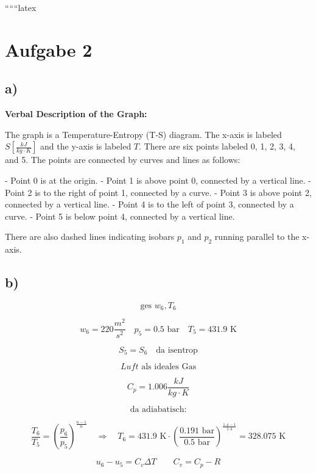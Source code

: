 
``````latex


\section*{Aufgabe 2}

\subsection*{a)}

\begin{center}
\textbf{Verbal Description of the Graph:}

The graph is a Temperature-Entropy (T-S) diagram. The x-axis is labeled \( S \left[ \frac{kJ}{kg \cdot K} \right] \) and the y-axis is labeled \( T \). There are six points labeled 0, 1, 2, 3, 4, and 5. The points are connected by curves and lines as follows:

- Point 0 is at the origin.
- Point 1 is above point 0, connected by a vertical line.
- Point 2 is to the right of point 1, connected by a curve.
- Point 3 is above point 2, connected by a vertical line.
- Point 4 is to the left of point 3, connected by a curve.
- Point 5 is below point 4, connected by a vertical line.

There are also dashed lines indicating isobars \( p_1 \) and \( p_2 \) running parallel to the x-axis.

\end{center}

\subsection*{b)}

\[
\text{ges } w_6, T_6
\]

\[
w_6 = 220 \frac{m^2}{s^2} \quad p_5 = 0.5 \text{ bar} \quad T_5 = 431.9 \text{ K}
\]

\[
S_5 = S_6 \quad \text{da isentrop}
\]

\[
Luft \text{ als ideales Gas}
\]

\[
C_p = 1.006 \frac{kJ}{kg \cdot K}
\]

\[
\text{da adiabatisch:}
\]

\[
\frac{T_6}{T_5} = \left( \frac{p_6}{p_5} \right)^{\frac{n-1}{n}} \quad \Rightarrow \quad T_6 = 431.9 \text{ K} \cdot \left( \frac{0.191 \text{ bar}}{0.5 \text{ bar}} \right)^{\frac{1.4-1}{1.4}} = 328.075 \text{ K}
\]

\[
u_6 - u_5 = C_v \Delta T \quad \quad C_v = C_p - R
\]

